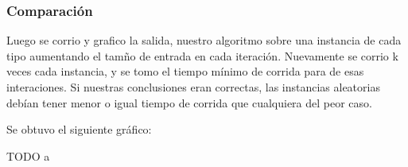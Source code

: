 \subsubsection{Comparaci\'on}

Luego se corrio y grafico la salida, nuestro algoritmo sobre una instancia de cada tipo aumentando el tamño de entrada en cada iteraci\'on. Nuevamente se corrio k veces cada instancia, y se tomo el tiempo m\'inimo de corrida para de esas interaciones. Si nuestras conclusiones eran correctas, las instancias aleatorias deb\'ian tener menor o igual tiempo de corrida que cualquiera del peor caso.

Se obtuvo el siguiente gr\'afico:

TODO
a
